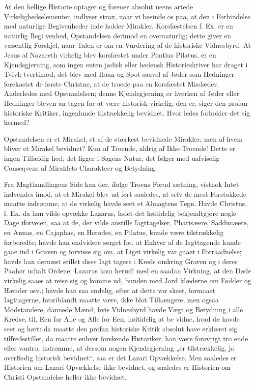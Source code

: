 \documentclass[12pt]{book}
\newcommand{\opage}[1]{\marginnote{\footnotesize\textit{[#1]}}}
\begin{document}
At den hellige Historie optager og forener absolut ueens\-%
artede Virkelighedselementer, indlyser strax, naar vi besinde
os paa, at den i Forbindelse med naturlige Begivenheder inde\-%
holder Mirakler. Korsfæstelsen f. Ex. er en naturlig Begi\-%
\opage{307}\setcounter{footnote}{0}%
venhed, Opstandelsen derimod en overnaturlig; dette giver en
væsentlig Forskjel, naar Talen er om en Vurdering af de
historiske Vidnesbyrd. At Jesus af Nazareth virkelig blev
korsfæstet under Pontius Pilatus, er en Kjendsgjerning, som
ingen enten jødisk eller hedensk Historieskriver har draget i Tvivl;
tvertimod, det blev med Haan og Spot saavel af Jøder som
Hedninger forekastet de første Christne, at de troede paa en
korsfæstet Misdæder. Anderledes med Opstandelsen; denne
Kjendsgjerning er hverken af Jøder eller Hedninger bleven an\-%
tagen for at være historisk virkelig; den er, siger den profan\-%
historiske Kritiker, ingenlunde tilstrækkelig bevidnet. Hvor\-%
ledes forholder det sig hermed?

Opstandelsen er et Mirakel, et af de stærkest bevidnede
Mirakler; men af hvem bliver et Mirakel bevidnet? Kun af
Troende, aldrig af Ikke-Troende! Dette er ingen Tilfældig\-%
hed; det ligger i Sagens Natur, det følger med uafviselig
Conseqvens af Miraklets Charakteer og Betydning.

Fra Magthandlingens Side kan der, ifølge Troens Forud\-%
sætning, vistnok Intet indvendes imod, at et Mirakel blev ud\-%
ført saaledes, at selv de mest Forstokkede maatte indrømme,
at de virkelig havde seet et Almagtens Tegn. Havde Christus,
f. Ex. da han vilde opvække Lazarus, ladet det høitidelig
bekjendtgjøre nogle Dage iforveien, saa at de, der vilde anstille
Iagttagelser, Pharisæere, Sadducæere, en Annas, en Cajaphas,
en Herodes, en Pilatus, kunde være tilstrækkelig forberedte;
havde han endvidere sørget for, at Enhver af de Iagttagende
kunde gaae ind i Graven og forvisse sig om, at Liget virkelig
var gaaet i Forraadnelse; havde han dernæst stillet disse Iagt\-%
tagere i Kreds omkring Graven og i deres Paahør udtalt
Ordene: Lazarus kom herud! med en saadan Virkning, at den
Døde virkelig saaes at reise sig og komme ud, bunden med Jord\-%
klæderne om Fødder og Hænder osv.; havde han saa endelig, efter
at dette var skeet, formaaet Iagttagerne, hvoriblandt maatte
være, ikke blot Tilhængere, men ogsaa Modstandere, dannede
\opage{308}\setcounter{footnote}{0}%
Mænd, hvis Vidnesbyrd havde Vægt og Betydning i alle
Kredse, til, Een for Alle og Alle for Een, høitidelig at be\-%
vidne, hvad de havde seet og hørt: da maatte den profan\-%
historiske Kritik absolut have erklæret sig tilfredsstillet, da
maatte enhver forskende Historiker, han være forøvrigt tro\-%
ende eller vantro, indrømme, at dersom nogen Kjendsgjerning
„er tilstrækkelig, ja overflødig historisk bevidnet“, saa er det
Lazari Opvækkelse. Men saaledes er Historien om Lazari
Opvækkelse ikke bevidnet, og saaledes er Historien om Christi
Opstandelse heller ikke bevidnet.
\end{document}
